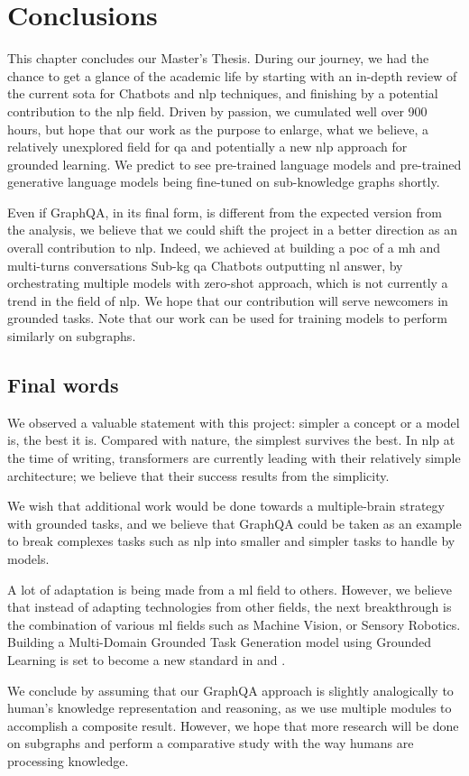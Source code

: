 \chapter{Conclusions}
\label{chap:final-conclusions}
This chapter concludes our Master's Thesis. During our journey, we had the chance to get a glance of the academic life by starting with an in-depth review of the current \gls{sota} for Chatbots and \gls{nlp} techniques, and finishing by a potential contribution to the \gls{nlp} field. Driven by passion, we cumulated well over 900 hours, but hope that our work as the purpose to enlarge, what we believe, a relatively unexplored field for \gls{qa} and potentially a new \gls{nlp} approach for grounded learning. We predict to see pre-trained language models and pre-trained generative language models being fine-tuned on sub-knowledge graphs shortly. 

Even if GraphQA, in its final form, is different from the expected version from the analysis, we believe that we could shift the project in a better direction as an overall contribution to \gls{nlp}. Indeed, we achieved at building a \gls{poc} of a \gls{mh} and multi-turns conversations Sub-\gls{kg} \gls{qa} Chatbots outputting \gls{nl} answer, by orchestrating multiple models with \gls{zero-shot} approach, which is not currently a trend in the field of \gls{nlp}. We hope that our contribution will serve newcomers in grounded tasks. Note that our work can be used for training models to perform similarly on subgraphs.


\section{Final words}
We observed a valuable statement with this project: simpler a concept or a model is, the best it is. Compared with nature, the simplest survives the best. In \gls{nlp} at the time of writing, \glspl{transformer} are currently leading with their relatively simple architecture; we believe that their success results from the simplicity.

We wish that additional work would be done towards a multiple-brain strategy with grounded tasks, and we believe that GraphQA could be taken as an example to break complexes tasks such as \gls{nlp} into smaller and simpler tasks to handle by models. 

A lot of adaptation is being made from a \gls{ml} field to others. However, we believe that instead of adapting technologies from other fields, the next breakthrough is the combination of various \gls{ml} fields such as Machine Vision, or Sensory Robotics. Building a Multi-Domain Grounded Task Generation model using Grounded Learning is set to become a new standard in  and .

We conclude by assuming that our GraphQA approach is slightly analogically to human's knowledge representation and reasoning, as we use multiple modules to accomplish a composite result. However, we hope that more research will be done on subgraphs and perform a comparative study with the way humans are processing knowledge.
